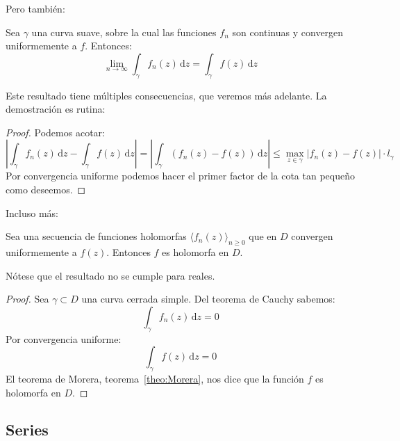   Pero también:
  \begin{theorem}
    \label{theo:int_f_n->int_f}
    Sea \(\gamma\) una curva suave,
    sobre la cual las funciones \(f_n\) son continuas
    y convergen uniformemente a \(f\).
    Entonces:
    \begin{equation}
      \label{eq:int_f_n->int_f}
      \lim_{n \rightarrow \infty} \int_\gamma f_n(z) \, \mathrm{d} z
	= \int_\gamma f(z) \, \mathrm{d} z
    \end{equation}
  \end{theorem}
  Este resultado tiene múltiples consecuencias,
  que veremos más adelante.
  La demostración es rutina:
  \begin{proof}
    Podemos acotar:
    \begin{equation*}
      \left\lvert
	\int_\gamma f_n(z) \, \mathrm{d} z
	  - \int_\gamma f(z) \, \mathrm{d} z
      \right\rvert
	= \left\lvert
	    \int_\gamma (f_n(z) - f(z)) \, \mathrm{d} z
	  \right\rvert
	\le \max_{z \in \gamma} \lvert f_n(z) - f(z) \rvert
	      \cdot l_\gamma
    \end{equation*}
    Por convergencia uniforme
    podemos hacer el primer factor de la cota
    tan pequeño como deseemos.
  \end{proof}
  Incluso más:
  \begin{theorem}
    \label{theo:holomorphic_f_n->holomorphic_f}
    Sea una secuencia de funciones holomorfas
    \(\langle f_n(z) \rangle_{n \ge 0}\) que en \(D\)
    convergen uniformemente a \(f(z)\).
    Entonces \(f\) es holomorfa en \(D\).
  \end{theorem}
  Nótese que el resultado no se cumple para reales.
  \begin{proof}
    Sea \(\gamma \subset D\) una curva cerrada simple.
    Del teorema de Cauchy sabemos:%
    \begin{equation*}
      \int_\gamma f_n(z) \, \mathrm{d} z
	= 0
    \end{equation*}
    Por convergencia uniforme:
    \begin{equation*}
      \int_\gamma f(z) \, \mathrm{d} z
	= 0
    \end{equation*}
    El teorema de Morera,
    teorema~\ref{theo:Morera},
    nos dice que
    la función \(f\) es holomorfa en \(D\).
  \end{proof}

\subsection{Series}
\label{sec:complex-series}

